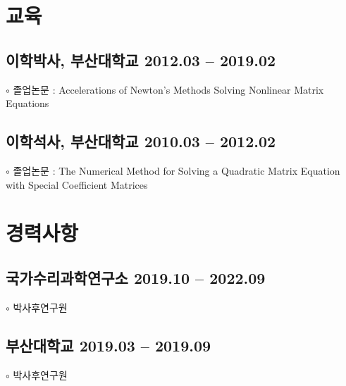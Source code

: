\documentclass[11pt]{article} %
\begin{document}

\section*{교육}

\subsection*{이학박사, 부산대학교 \hfill 2012.03 -- 2019.02} %
$\circ$ 졸업논문 : Accelerations of Newton's Methods Solving Nonlinear Matrix Equations

\subsection*{이학석사, 부산대학교 \hfill 2010.03 -- 2012.02} %
$\circ$ 졸업논문 : The Numerical Method for Solving a Quadratic Matrix Equation with Special Coefficient Matrices


%


\section*{경력사항}
\subsection*{국가수리과학연구소 \hfill 2019.10 -- 2022.09}
$\circ$ 박사후연구원
\subsection*{부산대학교 \hfill 2019.03 -- 2019.09}
$\circ$ 박사후연구원
\end{document}
